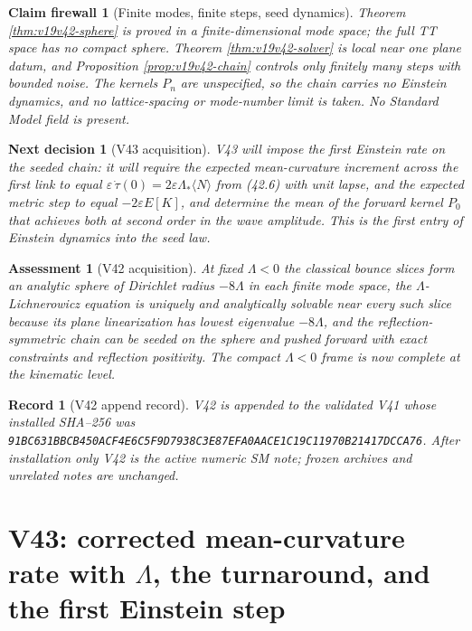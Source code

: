 \documentclass[11pt]{article}
\newtheorem{firewall}[theorem]{Claim firewall}
\newtheorem{decision}[theorem]{Next decision}
\newtheorem{assessment}[theorem]{Assessment}
\newtheorem{record}[theorem]{Record}
\theoremstyle{remark}
\begin{document}
\begin{firewall}[Finite modes, finite steps, seed dynamics]
\label{fire:v19v42}
Theorem \ref{thm:v19v42-sphere} is proved in a finite-dimensional
mode space; the full TT space has no compact sphere.  Theorem
\ref{thm:v19v42-solver} is local near one plane datum, and Proposition
\ref{prop:v19v42-chain} controls only finitely many steps with bounded
noise.  The kernels \(P_n\) are unspecified, so the chain carries no
Einstein dynamics, and no lattice-spacing or mode-number limit is
taken.  No Standard Model field is present.
\end{firewall}

\begin{decision}[V43 acquisition]
\label{dec:v19v42-next}
V43 will impose the first Einstein rate on the seeded chain: it will
require the expected mean-curvature increment across the first link to
equal \(\varepsilon\,\dot\tau(0)=2\varepsilon\Lambda_*\langle N\rangle\)
from (42.6) with unit lapse, and the expected metric step to equal
\(-2\varepsilon E[K]\), and determine the mean of the forward kernel
\(P_0\) that achieves both at second order in the wave amplitude.  This
is the first entry of Einstein dynamics into the seed law.
\end{decision}

\begin{assessment}[V42 acquisition]
\label{ass:v19v42}
At fixed \(\Lambda<0\) the classical bounce slices form an analytic
sphere of Dirichlet radius \(-8\Lambda\) in each finite mode space, the
\(\Lambda\)-Lichnerowicz equation is uniquely and analytically solvable
near every such slice because its plane linearization has lowest
eigenvalue \(-8\Lambda\), and the reflection-symmetric chain can be
seeded on the sphere and pushed forward with exact constraints and
reflection positivity.  The compact \(\Lambda<0\) frame is now
complete at the kinematic level.
\end{assessment}

\begin{record}[V42 append record]
\label{rec:v19v42}
V42 is appended to the validated V41 whose installed SHA--256 was
\texttt{91BC631BBCB450ACF4E6C5F9D7938C3E87EFA0AACE1C19C11970B21417DCCA76}.
After installation only V42 is the active numeric SM note; frozen
archives and unrelated notes are unchanged.
\end{record}


\section{V43: corrected mean-curvature rate with \(\Lambda\), the turnaround, and the first Einstein step}
\label{sec:v19v43}
\end{document}
